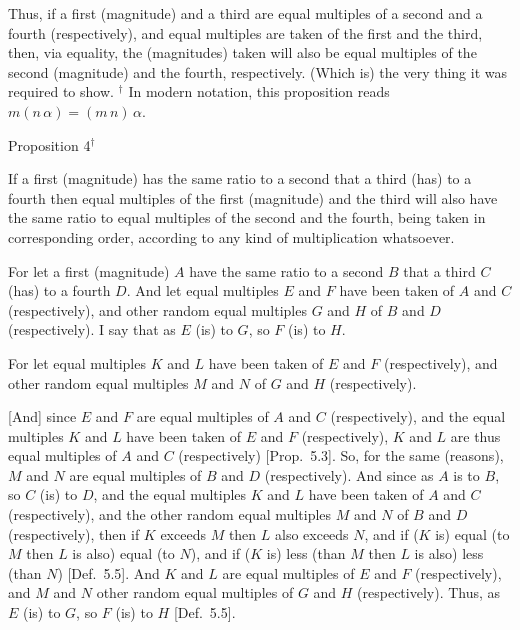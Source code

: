 \epsfysize=2in
\centerline{}

Thus, if a first (magnitude) and a third are equal multiples
of a second and a fourth (respectively), and equal multiples are taken of the
first and the third, then, via equality,  the 
(magnitudes) taken will also be equal multiples of the second (magnitude) and the fourth, respectively. (Which is) the very thing it was required to show.
{\footnotesize \noindent$^\dag$ In modern notation, this proposition reads
$m(n\,\alpha) = (m\,n)\,\alpha$.}



\begin{center}
{\large Proposition 4}$^\dag$
\end{center}

If  a first (magnitude) has the same ratio to a second 
that a third  (has) to a fourth then equal multiples of the first (magnitude) and the third will also have the same ratio to equal multiples of the second and the fourth,  being taken in corresponding order, according to any kind of
multiplication whatsoever.

For let a first (magnitude) $A$ have the same ratio to a second $B$ that
a third $C$  (has) to a fourth $D$. And let equal multiples $E$ and $F$ have
been taken of $A$ and $C$ (respectively), and  other random equal multiples
$G$ and $H$  of $B$ and $D$ (respectively). I say that as $E$ (is)
to $G$, so $F$ (is) to $H$.

\epsfysize=3in
\centerline{}

For let equal multiples $K$ and $L$ have been taken of $E$ and $F$ (respectively),
and other random equal multiples $M$ and $N$ of $G$ and $H$ (respectively).

\mbox{[}And] since $E$ and $F$ are equal multiples of $A$ and $C$ (respectively), and
the equal multiples $K$ and $L$ have been taken of $E$ and $F$ (respectively),
 $K$ and $L$ are thus equal multiples of $A$ and $C$ (respectively) [Prop.~5.3]. So, for the same (reasons), $M$ and $N$
 are equal multiples of $B$ and $D$ (respectively). And since as $A$ is to
 $B$, so $C$ (is) to $D$, and the equal multiples $K$ and $L$ have been taken of $A$ and
 $C$ (respectively), and the other random equal multiples  $M$ and $N$ of $B$ and $D$ (respectively), then if $K$ exceeds $M$ then $L$ also
 exceeds $N$, and if ($K$ is) equal (to $M$ then $L$ is also) equal (to $N$), and if ($K$ is) less (than $M$ then $L$ is also) less (than $N$) [Def.~5.5]. And $K$ and $L$ are equal multiples of 
 $E$ and $F$ (respectively), and $M$ and $N$ other random equal multiples of $G$ and $H$ (respectively). Thus, as $E$ (is) to $G$, so $F$ (is) to $H$ 
 [Def.~5.5].
 
